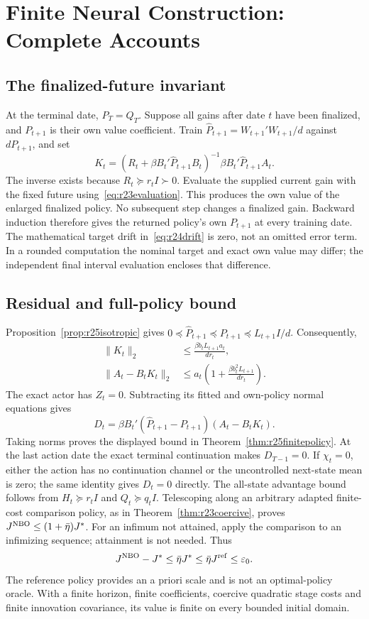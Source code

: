 \section{Finite Neural Construction: Complete Accounts}\label{sec:r25proofs}
\subsection{The finalized-future invariant}
At the terminal date, $P_T=Q_T$. Suppose all gains after date $t$ have been
finalized, and $P_{t+1}$ is their own value coefficient. Train
$\widehat P_{t+1}=W_{t+1}'W_{t+1}/d$ against $dP_{t+1}$, and set
\[
 K_t=(R_t+\beta B_t'\widehat P_{t+1}B_t)^{-1}
                       \beta B_t'\widehat P_{t+1}A_t.
\]
The inverse exists because $R_t\succeq r_tI\succ0$. Evaluate the supplied
current gain with the fixed future using~\eqref{eq:r23evaluation}. This
produces the own value of the enlarged finalized policy. No subsequent
step changes a finalized gain. Backward induction therefore gives the
returned policy's own $P_{t+1}$ at every training date. The mathematical
target drift in~\eqref{eq:r24drift} is zero, not an omitted error term.
In a rounded computation the nominal target and exact own value may differ;
the independent final interval evaluation encloses that difference.

\subsection{Residual and full-policy bound}
Proposition~\ref{prop:r25isotropic} gives
$0\preceq\widehat P_{t+1}\preceq P_{t+1}\preceq L_{t+1}I/d$.
Consequently,
\begin{align*}
 \|K_t\|_2&\leq\frac{\beta b_tL_{t+1}a_t}{d r_t},\\
 \|A_t-B_tK_t\|_2&\leq a_t
            \left(1+\frac{\beta b_t^2L_{t+1}}{d r_t}\right).
\end{align*}
The exact actor has $Z_t=0$. Subtracting its fitted and own-policy normal
equations gives
\[
 D_t=\beta B_t'(\widehat P_{t+1}-P_{t+1})(A_t-B_tK_t).
\]
Taking norms proves the displayed bound in
Theorem~\ref{thm:r25finitepolicy}. At the last action date the exact terminal
continuation makes $D_{T-1}=0$. If $\chi_t=0$, either the action has no
continuation channel or the uncontrolled next-state mean is zero; the same
identity gives $D_t=0$ directly. The all-state advantage bound follows from
$H_t\succeq r_tI$ and $Q_t\succeq q_tI$. Telescoping along an arbitrary
adapted finite-cost comparison policy, as in
Theorem~\ref{thm:r23coercive}, proves
$J^{\rm NBO}\leq(1+\bar\eta)J^*$. For an infimum not attained, apply the
comparison to an infimizing sequence; attainment is not needed. Thus
\[
 J^{\rm NBO}-J^*\leq\bar\eta J^*
             \leq\bar\eta J^{\rm ref}\leq\varepsilon_0.
\]
The reference policy provides an a priori scale and is not an optimal-policy
oracle. With a finite horizon, finite coefficients, coercive quadratic stage
costs and finite innovation covariance, its value is finite on every bounded
initial domain.

